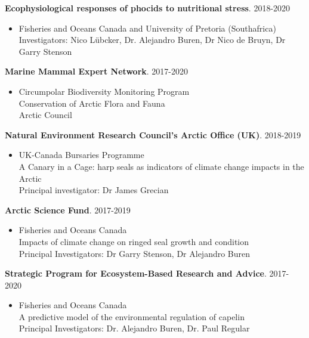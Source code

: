 \documentclass{res}
\begin{document}
\begin{resume}
{\bf Ecophysiological responses of phocids to nutritional stress}. 2018-2020
\begin{itemize} %
	\item[] Fisheries and Oceans Canada and University of Pretoria (Southafrica)\\
	Investigators: Nico L\"ubcker, Dr. Alejandro Buren, Dr Nico de Bruyn, Dr Garry Stenson
\end{itemize}

{\bf Marine Mammal Expert Network}. 2017-2020
\begin{itemize} %
	\item[] Circumpolar Biodiversity Monitoring Program\\
	Conservation of Arctic Flora and Fauna\\
	Arctic Council
\end{itemize}

{\bf Natural Environment Research Council's Arctic Office (UK)}. 2018-2019
\begin{itemize}
	\item[] UK-Canada Bursaries Programme\\
	A Canary in a Cage: harp seals as indicators of climate change impacts in the Arctic\\
	Principal investigator: Dr James Grecian
\end{itemize}
{\bf Arctic Science Fund}. 2017-2019
\begin{itemize} %
	\item[] Fisheries and Oceans Canada\\
	Impacts of climate change on ringed seal growth and condition\\
	Principal Investigators: Dr Garry Stenson, Dr Alejandro Buren
\end{itemize}
{\bf Strategic Program for Ecosystem-Based Research and Advice}. 2017-2020
\begin{itemize} %
	\item[] Fisheries and Oceans Canada\\
	A predictive model of the environmental regulation of capelin\\
	Principal Investigators: Dr. Alejandro Buren, Dr. Paul Regular
\end{itemize}


\end{resume}
\end{document}
